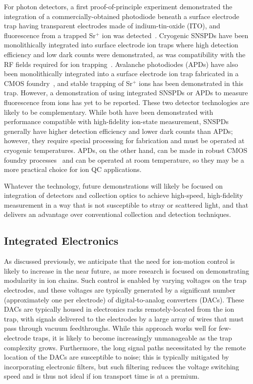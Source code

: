 \documentclass[%
12pt,
 amsmath,amssymb,
]{revtex4-2}
\begin{document}
For photon detectors, a first proof-of-principle experiment demonstrated the integration of a commercially-obtained photodiode beneath a surface electrode trap having transparent electrodes made of indium-tin-oxide (ITO), and fluorescence from a trapped Sr$^+$ ion was detected~\cite{EltonyITOTrap2013}. Cryogenic SNSPDs have been monolithically integrated into surface electrode ion traps where high detection efficiency and low dark counts were demonstrated, as was compatibility with the RF fields required for ion trapping~\cite{SlichterSNSPD2017}.  Avalanche photodiodes (APDs) have also been monolithically integrated into a surface electrode ion trap fabricated in a CMOS foundry~\cite{MehtaThesis2017}, and stable trapping of Sr$^+$ ions has been demonstrated in this trap.  However, a demonstration of using integrated SNSPDs or APDs to measure fluorescence from ions has yet to be reported.  These two detector technologies are likely to be complementary.  While both have been demonstrated with performance compatible with high-fidelity ion-state measurement, SNSPDs generally have higher detection efficiency and lower dark counts than APDs; however, they require special processing for fabrication and must be operated at cryogenic temperatures.  APDs, on the other hand, can be made in robust CMOS foundry processes~\cite{FieldAPD2010} and can be operated at room temperature, so they may be a more practical choice for ion QC applications.

Whatever the technology, future demonstrations will likely be focused on  integration of detectors and collection optics to achieve high-speed, high-fidelity measurement in a way that is not susceptible to stray or scattered light, and that delivers an advantage over conventional collection and detection techniques.

    \subsection{Integrated Electronics}
As discussed previously, we anticipate that the need for ion-motion control is likely to increase in the near future, as more research is focused on demonstrating modularity in ion chains.  Such control is enabled by varying voltages on the trap electrodes, and these voltages are typically generated by a significant number (approximately one per electrode) of digital-to-analog converters (DACs).  These DACs are typically housed in electronics racks remotely-located from the ion trap, with signals delivered to the electrodes by a large array of wires that must pass through vacuum feedthroughs.  While this approach works well for few-electrode traps, it is likely to become increasingly unmanageable as the trap complexity grows.  Furthermore, the long signal paths necessitated by the remote location of the DACs are susceptible to noise; this is typically mitigated by incorporating electronic filters, but such filtering reduces the voltage switching speed and is thus not ideal if ion transport time is at a premium.
\end{document}
